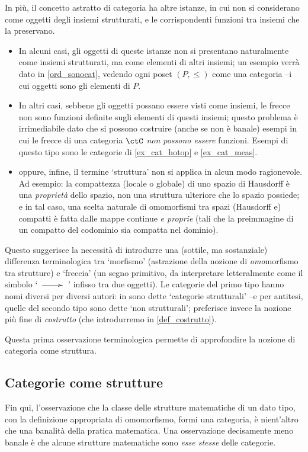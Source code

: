 \begin{remark}
 In più, il concetto astratto di categoria ha altre istanze, in cui non si considerano come oggetti degli insiemi strutturati, e le corrispondenti funzioni tra insiemi che la preservano.
 \begin{itemize}
  \item In alcuni casi, gli oggetti di queste istanze non si presentano naturalmente come insiemi strutturati, ma come elementi di altri insiemi; un esempio verrà dato in \ref{ord_sonocat}, vedendo ogni poset \((P,\le)\) come una categoria --i cui oggetti sono gli elementi di \(P\).
  \item In altri casi, sebbene gli oggetti possano essere visti come insiemi, le frecce non sono funzioni definite sugli elementi di questi insiemi; questo problema è irrimediabile dato che si possono costruire (anche se non è banale) esempi in cui le frecce di una categoria \(\ctC\) \emph{non possono essere} funzioni. Esempi di questo tipo sono le categorie di \ref{ex_cat_hotop} e \ref{ex_cat_meas}.
  \item oppure, infine, il termine `struttura' non si applica in alcun modo ragionevole. Ad esempio: la compattezza (locale o globale) di uno spazio di Hausdorff è una \emph{proprietà} dello spazio, non una struttura ulteriore che lo spazio possiede; e in tal caso, una scelta naturale di omomorfismi tra spazi (Hausdorff e) compatti è fatta dalle mappe continue \emph{e proprie} (tali che la preimmagine di un compatto del codominio sia compatta nel dominio).
 \end{itemize}
 Questo suggerisce la necessità di introdurre una (sottile, ma sostanziale) differenza terminologica tra `morfismo' (astrazione della nozione di \emph{omo}morfismo tra strutture) e `freccia' (un segno primitivo, da interpretare letteralmente come il simbolo `\(\xymatrix{ \ar[r] & }\)' infisso tra due oggetti). Le categorie del primo tipo hanno nomi diversi per diversi autori: in \cite[5.3.1.5]{kromer} sono dette `categorie strutturali' --e per antitesi, quelle del secondo tipo sono dette `non strutturali'; \cite{acc} preferisce invece la nozione più fine di \emph{costrutto} (che introdurremo in \ref{def_costrutto}).
\end{remark}
Questa prima osservazione	terminologica permette di approfondire la nozione di categoria come struttura.
\subsection{Categorie come strutture}\label{ssec:categorie_strutture}
Fin qui, l'osservazione che la classe delle strutture matematiche di un dato tipo, con la definizione appropriata di omomorfismo, formi una categoria, è nient'altro che una banalità della pratica matematica. Una osservazione decisamente meno banale è che alcune strutture matematiche sono \emph{esse stesse} delle categorie.

